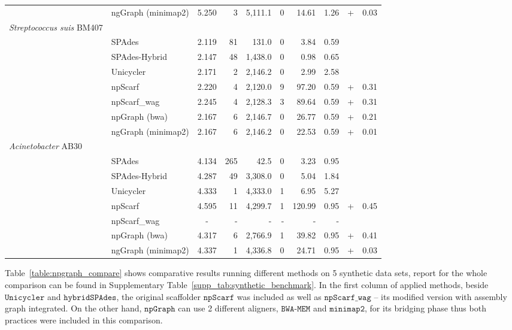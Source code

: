 \documentclass[10pt,twocolumn,twoside]{genpaper}
\newcommand{\npscarf}{$\mathtt{npScarf}$}
\newcommand{\npscarfg}{$\mathtt{npScarf\_wag}$}
\newcommand{\npgraph}{$\mathtt{npGraph}$}
\newcommand{\unicycler}{$\mathtt{Unicycler}$}
\newcommand{\minimap}{$\mathtt{minimap2}$}
\newcommand{\bwa}{$\mathtt{BWA\text{-}MEM}$}
\begin{document}
\begin{longtable}{llcrrrrr@{\hspace{2pt}}c@{\hspace{2pt}}r}
 & ngGraph (minimap2)  & 5.250 & 3  & 5,111.1  & 0  & 14.61  &  1.26 & + & 0.03 \\
\rowcolor{Gray} \multicolumn{10}{l}
{\emph{Streptococcus suis} BM407} \\*  
 & SPAdes  & 2.119 &  81 &  131.0 & 0  & 3.84  & 0.59  &  &  \\*
 & SPAdes-Hybrid  & 2.147 & 48  &  1,438.0 &  0 &  0.98 & 0.65  &  &  \\*
 & Unicycler  & 2.171 &  2 &  2,146.2 & 0  &  2.99 &  2.58  &  &  \\*
 & npScarf  & 2.220 &  4 &  2,120.0  & 9  & 97.20  & 0.59 & + & 0.31 \\*
 & npScarf\_wag  & 2.245 & 4  &  2,128.3  & 3  &  89.64 & 0.59 & + &  0.31\\*
 & npGraph (bwa)  & 2.167 & 6  & 2,146.7  &  0 &  26.77 & 0.59  & + &  0.21\\*
 & ngGraph (minimap2)  & 2.167 & 6  &  2,146.2 &  0 & 22.53  &  0.59 & + & 0.01 \\
\rowcolor{Gray} \multicolumn{10}{l}
{\emph{Acinetobacter} AB30} \\*  
 & SPAdes  & 4.134 & 265  & 42.5  &  0 &  3.23 & 0.95  &  &  \\*
 & SPAdes-Hybrid  & 4.287 & 49  &  3,308.0 &  0 & 5.04  & 1.84  &  &  \\*
 & Unicycler  & 4.333 & 1  &  4,333.0 &  1 & 6.95  &  5.27 &  &  \\*
 & npScarf  & 4.595 & 11  & 4,299.7  & 1  & 120.99  & 0.95  & + & 0.45 \\*
 & npScarf\_wag  & - & -  &  - & -  &  - &  - &  &  \\*
 & npGraph (bwa)  & 4.317 & 6  &  2,766.9 & 1  &  39.82 &  0.95 & + & 0.41 \\*
 & ngGraph (minimap2)  & 4.337 & 1  &  4,336.8 & 0  & 24.71  & 0.95  & + & 0.03 \\
\end{longtable}

\normalsize

Table~\ref{table:npgraph_compare} shows comparative results running different methods on 5 synthetic data sets, report for the whole comparison can be found in Supplementary Table~\ref{supp_tab:synthetic_benchmark}.
In the first column of applied methods, beside \unicycler{} and $\mathtt{hybridSPAdes}$, the original scaffolder \npscarf{} was included as well as \npscarfg{} -- its modified version with assembly graph integrated.
On the other hand, \npgraph{} can use 2 different aligners, \bwa{} and \minimap{}, for its bridging phase thus both practices were included in this comparison.
\end{document}
